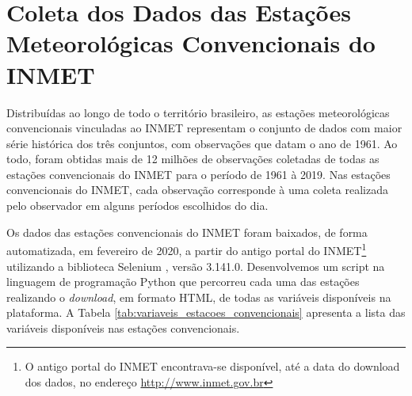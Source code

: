 \section{Coleta dos Dados das Estações Meteorológicas Convencionais do INMET}

Distribuídas ao longo de todo o território brasileiro, as estações meteorológicas convencionais vinculadas ao INMET representam o conjunto de dados com maior série histórica dos três conjuntos, com observações que datam o ano de 1961. Ao todo, foram obtidas mais de 12 milhões de observações coletadas de todas as estações convencionais do INMET para o período de 1961 à 2019. Nas estações convencionais do INMET, cada observação corresponde à uma coleta realizada pelo observador em alguns períodos escolhidos do dia. 

Os dados das estações convencionais do INMET foram baixados, de forma automatizada, em fevereiro de 2020, a partir do antigo portal do INMET\footnote{O antigo portal do INMET encontrava-se disponível, até a data do download dos dados, no endereço \href{http://www.inmet.gov.br}{http://www.inmet.gov.br}} utilizando a biblioteca Selenium \cite{salunke2014selenium}, versão 3.141.0. Desenvolvemos um script na linguagem de programação Python que percorreu cada uma das estações realizando o \textit{download}, em formato HTML, de todas as variáveis disponíveis na plataforma. A Tabela \ref{tab:variaveis_estacoes_convencionais} apresenta a lista das variáveis disponíveis nas estações convencionais.

